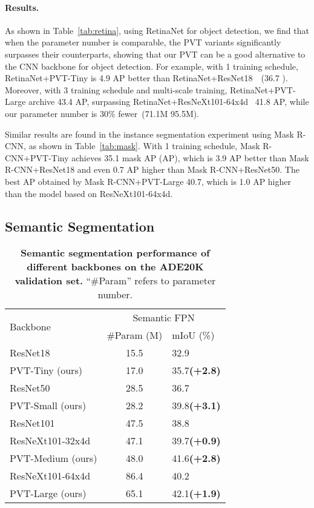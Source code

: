 \documentclass[10pt,twocolumn,letterpaper]{article}
\newlength\savedwidth
\newcommand\whline{\noalign{\global\savedwidth\arrayrulewidth\global\arrayrulewidth 0.8pt}\hline\noalign{\global\arrayrulewidth\savedwidth}}
\newcommand{\green}[1]{\textcolor[RGB]{96,177,87}{#1}}
\newcommand{\fn}[1]{\footnotesize{#1}}
\newcommand{\gbf}[1]{\green{\bf{\fn{(#1)}}}}
\begin{document}
\paragraph{Results.}
As shown in Table~\ref{tab:retina}, using RetinaNet for object detection, we find that when the parameter number is comparable, the PVT variants significantly surpasses their counterparts, showing that our PVT can be a good alternative to the CNN backbone for object detection.
For example, with 1 training schedule, RetinaNet+PVT-Tiny is 4.9 AP better than RetinaNet+ResNet18~\cite{he2016deep}~(36.7 ).
Moreover, with 3 training schedule and multi-scale training, RetinaNet+PVT-Large archive 43.4 AP, surpassing RetinaNet+ResNeXt101-64x4d~\cite{xie2017aggregated} 41.8 AP, while our parameter number is 30\% fewer~(71.1M \vs 95.5M).

Similar results are found in the instance segmentation experiment using Mask R-CNN, as shown in Table~\ref{tab:mask}.
With 1 training schedule, Mask R-CNN+PVT-Tiny achieves 35.1 mask AP (AP), which is 3.9 AP better than Mask R-CNN+ResNet18 and even 0.7 AP higher than Mask R-CNN+ResNet50. 
The best AP obtained by Mask R-CNN+PVT-Large 40.7, which is 1.0 AP higher than the model based on ResNeXt101-64x4d.


\subsection{Semantic Segmentation}
\label{sec:seg}
\begin{table}[t]
    \centering
\setlength{\tabcolsep}{2.6mm}
    \begin{tabular}{l|c|l}
\multirow{2}{*}{Backbone} & \multicolumn{2}{c}{Semantic FPN}\\
	\cline{2-3}
	& \#Param (M) & mIoU (\%)   \\
	\whline
ResNet18~\cite{he2016deep} & {15.5} & 32.9 \\
	\rowcolor{mygray}
	PVT-Tiny (ours) & 17.0 & {35.7}\gbf{+2.8} \\
	\hline
ResNet50~\cite{he2016deep} & 28.5 & 36.7\\
\rowcolor{mygray}
PVT-Small (ours) & {28.2}& {39.8}\gbf{+3.1}\\
\hline
ResNet101~\cite{he2016deep} & 47.5& 38.8\\
ResNeXt101-32x4d~\cite{xie2017aggregated} & {47.1} & 39.7\gbf{+0.9} \\
\rowcolor{mygray}
PVT-Medium (ours) & 48.0 & {41.6}\gbf{+2.8}\\
\hline
ResNeXt101-64x4d~\cite{xie2017aggregated} & 86.4 & 40.2\\
\rowcolor{mygray}
PVT-Large (ours) & {65.1} & {42.1}\gbf{+1.9} \\
\end{tabular}     \caption{\textbf{Semantic segmentation performance of different backbones on the ADE20K validation set.} ``\#Param'' refers to parameter number. 
    }
    \label{tab:seg}
\end{table}
\end{document}
